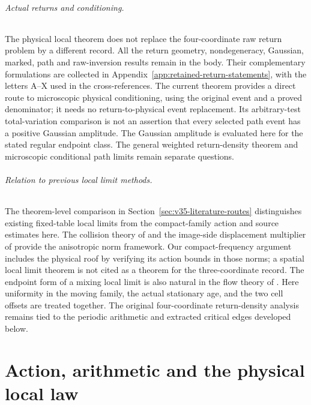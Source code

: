 \documentclass[11pt,reqno]{amsart}
\numberwithin{equation}{section}
\theoremstyle{definition}\newtheorem{definition}[theorem]{Definition}
\theoremstyle{remark}\newtheorem{remark}[theorem]{Remark}
\begin{document}
\paragraph{Actual returns and conditioning.}
The physical local theorem does not replace the four-coordinate raw
return problem by a different record. All the return geometry,
nondegeneracy, Gaussian, marked, path and raw-inversion results remain
in the body. Their complementary formulations are collected in
Appendix~\ref{app:retained-return-statements}, with the letters A--X
used in the cross-references. The current theorem provides a direct
route to microscopic physical conditioning, using the original event
and a proved denominator; it needs no return-to-physical event
replacement. Its arbitrary-test total-variation comparison is not an
assertion that every selected path event has a positive Gaussian
amplitude. The Gaussian amplitude is evaluated here for the stated
regular endpoint class. The general weighted return-density theorem
and microscopic conditional path limits remain separate questions.

\paragraph{Relation to previous local limit methods.}
The theorem-level comparison in Section~\ref{sec:v35-literature-routes} distinguishes existing fixed-table local limits from the compact-family action and source estimates here. The collision theory of \cite{DZ11,DZ} and the image-side displacement
multiplier of \cite{DPZ} provide the anisotropic norm framework.
Our compact-frequency argument includes the physical roof by verifying
its action bounds in those norms; a spatial local limit theorem is not
cited as a theorem for the three-coordinate record. The endpoint form
of a mixing local limit is also natural in the flow theory of
\cite{DN}. Here uniformity in the moving family, the actual stationary
age, and the two cell offsets are treated together. The original
four-coordinate return-density analysis remains tied to the periodic
arithmetic and extracted critical edges developed below.

\part{Action, arithmetic and the physical local law}









\end{document}
